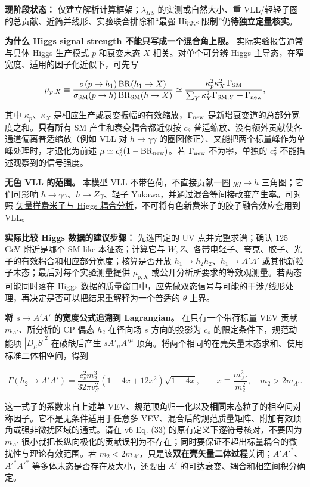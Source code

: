 \documentclass[
  chinese,
  UTF8]{ctexart}
\begin{document}
\textbf{现阶段状态：} 仅建立解析计算框架；\(\lambda_{HS}\)
的实测或自然大小、重
VLL/轻轻子圈的总贡献、近简并线形、实验联合排除和``最强 Higgs
限制''仍\textbf{待独立定量核实}。

\textbf{为什么 Higgs signal strength 不能只写成一个混合角上限。}
实际实验报告通常与具体 Higgs 生产模式 \(p\) 和衰变末态 \(X\)
相关。对单个可分辨 Higgs 主导态，在窄宽度、适用的因子化近似下，可先写

\[
\mu_{p,X}\equiv\frac{\sigma(p\to h_1)\,{\rm BR}(h_1\to X)}
{\sigma_{\rm SM}(p\to h)\,{\rm BR}_{\rm SM}(h\to X)}
\simeq\frac{\kappa_p^2\kappa_X^2\,\Gamma_{\rm SM}}
{\sum_Y\kappa_Y^2\Gamma_{{\rm SM},Y}+\Gamma_{\rm new}},
\]

其中 \(\kappa_p\)、\(\kappa_X\)
是相应生产或衰变振幅的有效缩放，\(\Gamma_{\rm new}\)
是新增衰变道的总部分宽度之和。\textbf{只有}所有 SM
产生和衰变耦合都近似按 \(c_\theta\)
普适缩放、没有额外贡献使各通道偏离普适缩放（例如 VLL 对
\(h\to\gamma\gamma\)
的圈图修正）、又能把两个标量峰作为单峰处理时，才退化为前述
\(\mu\simeq c_\theta^2(1-\mathrm{BR}_{\rm new})\)。若
\(\Gamma_{\rm new}\) 不为零，单独的 \(c_\theta^2\)
不能描述观察到的信号强度。

\textbf{无色 VLL 的范围。} 本模型 VLL 不带色荷，不直接贡献一圈
\(gg\to h\) 三角图；它们可影响
\(h\to\gamma\gamma\)、\(h\to Z\gamma\)、轻子
Yukawa，并通过混合等间接改变产生率。可对照
\href{https://arxiv.org/abs/1207.7062}{矢量样费米子与 Higgs
耦合分析}，不可将有色新费米子的胶子融合效应套用到 VLL。

\textbf{实际比较 Higgs 数据的建议步骤：} 先选固定的 UV
点并完整求谱；确认 125 GeV 附近是哪个 SM-like 本征态；计算它与
\(W,Z\)、各带电轻子、夸克、胶子、光子的有效耦合和相应部分宽度；核算是否开放
\(h_1\to h_2h_2\)、\(h_1\to A'A'\)
或其他新粒子末态；最后对每个实验测量提供 \(\mu_{p,X}\)
或公开分析所要求的等效观测量。若两态可能同时落在 Higgs
数据的质量窗口中，应先做双态信号与可能的干涉/线形处理，再决定是否可以把结果重解释为一个普适的
\(\theta\) 上界。

\textbf{将 \(s\to A'A'\) 的宽度公式追溯到 Lagrangian。}
在只有一个带荷标量 VEV 贡献 \(m_{A'}\)、所分析的 CP 偶态 \(h_2\)
在径向场 \(s\) 方向的投影为 \(c_s\) 的限定条件下，规范动能项
\(|D_\mu S|^2\) 在破缺后产生 \(sA'_\mu A'^{\mu}\)
顶角。将两个相同的在壳矢量末态求和、使用标准二体相空间，得到

\[
\Gamma(h_2\to A'A')=
\frac{c_s^2m_2^3}{32\pi v_S^2}
(1-4x+12x^2)\sqrt{1-4x},\qquad
x\equiv\frac{m_{A'}^2}{m_2^2},\quad m_2>2m_{A'}.
\]

这一式子的系数来自上述单
VEV、规范顶角归一化以及\textbf{相同}末态粒子的相空间对称因子。它不是无条件适用于任意多
VEV、混合后的规范质量矩阵、附加有效顶角或强非微扰区域的通式。请在 v6 Eq.
(33) 的原有定义下逐符号核对，不要因为 \(m_{A'}\)
很小就把长纵向极化的贡献误判为不存在；同时要保证不超出标量耦合的微扰性与理论有效范围。若
\(m_2<2m_{A'}\)，只是该\textbf{双在壳矢量二体过程}关闭；\(A'A'^*\)、\(A'^*A'^*\)
等多体末态是否存在及大小，还要由 \(A'\)
的可达衰变、耦合和相空间积分确定。
\end{document}
